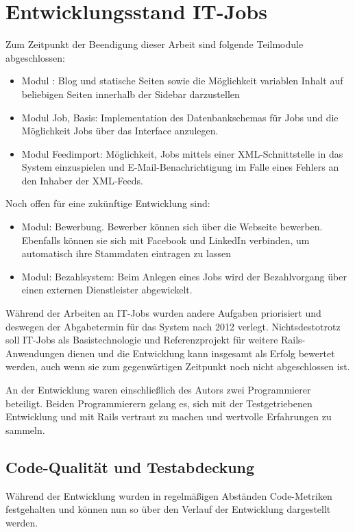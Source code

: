 \section{Entwicklungsstand IT-Jobs}
Zum Zeitpunkt der Beendigung dieser Arbeit sind folgende Teilmodule abgeschlossen:
\begin{itemize}
 \item Modul : Blog und statische Seiten sowie die Möglichkeit variablen Inhalt auf beliebigen Seiten innerhalb der Sidebar darzustellen
 \item Modul Job, Basis: Implementation des Datenbankschemas für Jobs und die Möglichkeit Jobs über das Interface anzulegen.
 \item Modul Feedimport: Möglichkeit, Jobs mittels einer XML-Schnittstelle in das System einzuspielen und E-Mail-Benachrichtigung im Falle eines Fehlers an den Inhaber der XML-Feeds.
\end{itemize}
Noch offen für eine zukünftige Entwicklung sind:
\begin{itemize}
 \item Modul: Bewerbung. Bewerber können sich über die Webseite bewerben. Ebenfalls können sie sich mit Facebook und LinkedIn verbinden, um automatisch ihre Stammdaten eintragen zu lassen
 \item Modul: Bezahlsystem: Beim Anlegen eines Jobs wird der Bezahlvorgang über einen externen Dienstleister abgewickelt.
\end{itemize}

Während der Arbeiten an IT-Jobs wurden andere Aufgaben priorisiert und deswegen der Abgabetermin für das System nach 2012 verlegt. Nichtsdestotrotz soll IT-Jobs als Basistechnologie und Referenzprojekt für weitere Rails-Anwendungen dienen und die Entwicklung kann insgesamt als Erfolg bewertet werden, auch wenn sie zum gegenwärtigen Zeitpunkt noch nicht abgeschlossen ist.

An der Entwicklung waren einschließlich des Autors zwei Programmierer beteiligt. Beiden Programmierern gelang es, sich mit der Testgetriebenen Entwicklung und mit Rails vertraut zu machen und wertvolle Erfahrungen zu sammeln.

\subsection*{Code-Qualität und Testabdeckung}
Während der Entwicklung wurden in regelmäßigen Abständen Code-Metriken festgehalten und können nun so über den Verlauf der Entwicklung dargestellt werden.

